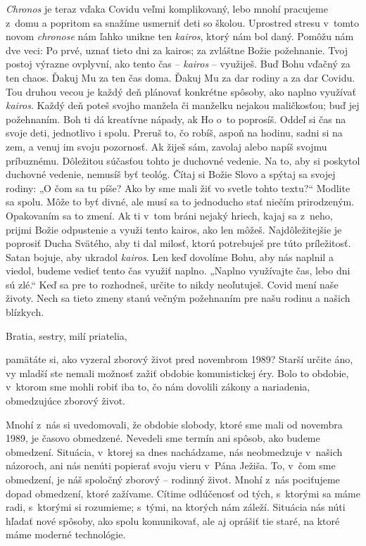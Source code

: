 {\it Chronos} je teraz vďaka Covidu veľmi komplikovaný, lebo mnohí pracujeme z~domu a popritom sa snažíme usmerniť deti so školou. Uprostred stresu v~tomto novom {\it chronose} nám ľahko unikne ten {\it kairos}, ktorý nám bol daný. Pomôžu nám dve veci: Po prvé, uznať tieto dni za kairos; za zvláštne Božie požehnanie. Tvoj postoj výrazne ovplyvní, ako tento čas – {\it kairos} – využiješ. Buď Bohu vďačný za ten chaos. Ďakuj Mu za ten čas doma. Ďakuj Mu za dar rodiny a za dar Covidu. Tou druhou vecou je každý deň plánovať konkrétne spôsoby, ako naplno využívať {\it kairos}. Každý deň poteš svojho manžela či manželku nejakou maličkosťou; buď jej požehnaním. Boh ti dá kreatívne nápady, ak Ho o~to poprosíš. Oddeľ si čas na svoje deti, jednotlivo i spolu. Preruš to, čo robíš, aspoň na hodinu, sadni si na zem, a venuj im svoju pozornosť. Ak žiješ sám, zavolaj alebo napíš svojmu príbuznému. Dôležitou súčasťou tohto je duchovné vedenie. Na to, aby si poskytol duchovné vedenie, nemusíš byť teológ. Čítaj si Božie Slovo a spýtaj sa svojej rodiny: „O čom sa tu píše? Ako by sme mali žiť vo svetle tohto textu?“ Modlite sa spolu. Môže to byť divné, ale musí sa to jednoducho stať niečím prirodzeným. Opakovaním sa to zmení. Ak ti v~tom bráni nejaký hriech, kajaj sa z~neho, prijmi Božie odpustenie a využi tento kairos, ako len môžeš. Najdôležitejšie je poprosiť Ducha Svätého, aby ti dal milosť, ktorú potrebuješ pre túto príležitosť. Satan bojuje, aby ukradol {\it kairos}. Len keď dovolíme Bohu, aby nás naplnil a viedol, budeme vedieť tento čas využiť naplno. „Naplno využívajte čas, lebo dni sú zlé.“ Keď sa pre to rozhodneš, určite to nikdy neoľutuješ. Covid mení naše životy. Nech sa tieto zmeny stanú večným požehnaním pre našu rodinu a našich blízkych.



Bratia, sestry, milí priatelia,

pamätáte si, ako vyzeral zborový život pred novembrom 1989? Starší určite áno, vy mladší ste nemali možnosť zažiť obdobie komunistickej éry. Bolo to obdobie, v~ktorom sme mohli robiť iba to, čo nám dovolili zákony a nariadenia, obmedzujúce zborový život.

Mnohí z~nás si uvedomovali, že obdobie slobody, ktoré sme mali od novembra 1989, je časovo obmedzené. Nevedeli sme termín ani spôsob, ako budeme obmedzení. Situácia, v~ktorej sa dnes nachádzame, nás neobmedzuje v~našich názoroch, ani nás nenúti popierať svoju vieru v~Pána Ježiša. To, v~čom sme obmedzení, je náš spoločný zborový -- rodinný život. Mnohí z~nás pociťujeme dopad obmedzení, ktoré zažívame. Cítime odlúčenosť od tých, s~ktorými sa máme radi, s~ktorými si rozumieme; s~tými, na ktorých nám záleží. Situácia nás núti hľadať nové spôsoby, ako spolu komunikovať, ale aj oprášiť tie staré, na ktoré máme moderné technológie.

